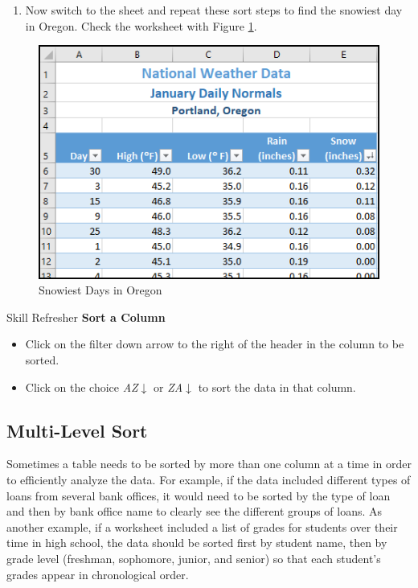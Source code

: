 \begin{enumerate}
	\item Now switch to the  sheet and repeat these sort steps to find the snowiest day in Oregon. Check the worksheet with Figure \ref{05:fig10}.
\end{enumerate}

\begin{figure}[H]
	\centering
	\includegraphics[width=\maxwidth{.95\linewidth}]{gfx/ch05_fig10}
	\caption{Snowiest Days in Oregon}
	\label{05:fig10}
\end{figure}

\begin{center}
	\begin{sklbox}{Skill Refresher}
		\textbf{Sort a Column}
		\\
		\begin{itemize}
			\setlength{\itemsep}{0pt}
			\setlength{\parskip}{0pt}
			\setlength{\parsep}{0pt}

			\item Click on the filter down arrow to the right of the header in the column to be sorted.
			\item Click on the choice \textit{AZ}$ \downarrow $ or \textit{ZA}$ \downarrow $ to sort the data in that column.
						
		\end{itemize}
	\end{sklbox}
\end{center}

\subsection{Multi-Level Sort}

Sometimes a table needs to be sorted by more than one column at a time in order to efficiently analyze the data. For example, if the data included different types of loans from several bank offices, it would need to be sorted by the type of loan and then by bank office name to clearly see the different groups of loans. As another example, if a worksheet included a list of grades for students over their time in high school, the data should be sorted first by student name, then by grade level (freshman, sophomore, junior, and senior) so that each student's grades appear in chronological order.

